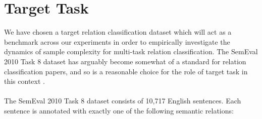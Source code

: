 \section{Target Task}
\label{target_task}
We have chosen a target relation classification dataset which will act as a benchmark across our experiments in order to empirically investigate the dynamics of sample complexity for multi-task relation classification. The SemEval 2010 Task 8 dataset has arguably become somewhat of a standard for relation classification papers, and so is a reasonable choice for the role of target task in this context \citep{hendrickx2009}.
\\\\
The SemEval 2010 Task 8 dataset consists of 10,717 English sentences. Each sentence is annotated with exactly one of the following semantic relations:

